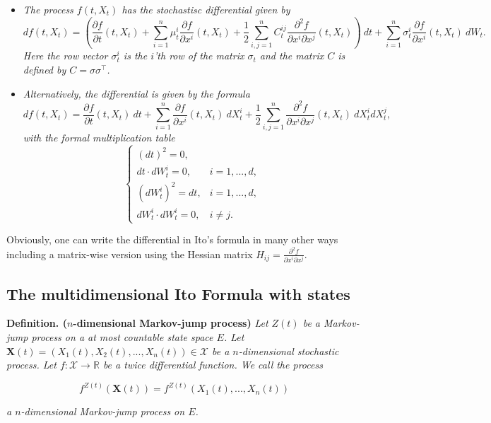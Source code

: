 \documentclass[
]{book}
\providecommand{\tightlist}{%
  \setlength{\itemsep}{0pt}\setlength{\parskip}{0pt}}
\begin{document}
\begin{itemize}
\tightlist
\item
  \emph{The process \(f(t,X_t)\) has the stochastisc differential given by}
  \[
    df(t,X_t)=\left(\frac{\partial f}{\partial t}(t,X_t) + \sum_{i=1}^n\mu^i_t\frac{\partial f}{\partial x^i}(t,X_t) + \frac{1}{2}\sum_{i,j=1}^nC_t^{ij}\frac{\partial^2 f}{\partial x^i\partial x^j}(t,X_t)\right)\ dt+\sum_{i=1}^n\sigma^i_t\frac{\partial f}{\partial x^i}(t,X_t)\ dW_t.
    \]
  \emph{Here the row vector \(\sigma^i_t\) is the \(i\)'th row of the matrix \(\sigma_t\) and the matrix \(C\) is defined by \(C=\sigma\sigma^\top\).}
\item
  \emph{Alternatively, the differential is given by the formula}
  \[
    df(t,X_t)=\frac{\partial f}{\partial t}(t,X_t)\ dt + \sum_{i=1}^n\frac{\partial f}{\partial x^i}(t,X_t)\ dX^i_t + \frac{1}{2}\sum_{i,j=1}^n\frac{\partial^2 f}{\partial x^i\partial x^j}(t,X_t)\ dX^i_tdX^j_t,
    \]
  \emph{with the formal multiplication table}
  \[
    \left\{\begin{matrix}(dt)^2=0,\\  dt\cdot dW_t^i=0, & i = 1,...,d,\\ (dW_t^i)^2=dt, & i=1,...,d, \\ dW_t^i\cdot dW_t^i =0, & i\ne j.\end{matrix}\right.
    \]
\end{itemize}

Obviously, one can write the differential in Ito's formula in many other ways including a matrix-wise version using the Hessian matrix \(H_{ij}=\frac{\partial^2 f}{\partial x^i\partial x^j}\).

\hypertarget{the-multidimensional-ito-formula-with-states}{%
\subsection{The multidimensional Ito Formula with states}\label{the-multidimensional-ito-formula-with-states}}

\textbf{Definition. (\(n\)-dimensional Markov-jump process)} \emph{Let \(Z(t)\) be a Markov-jump process on a at most countable state space \(E\). Let \(\mathbf X(t)=(X_1(t),X_2(t),...,X_n(t))\in\mathcal X\) be a \(n\)-dimensional stochastic process. Let \(f : \mathcal X\to \mathbb R\) be a twice differential function. We call the process}

\[
f^{Z(t)}(\mathbf X(t))=f^{Z(t)}(X_1(t),...,X_n(t))
\]

\emph{a \(n\)-dimensional Markov-jump process on \(E\).}
\end{document}
